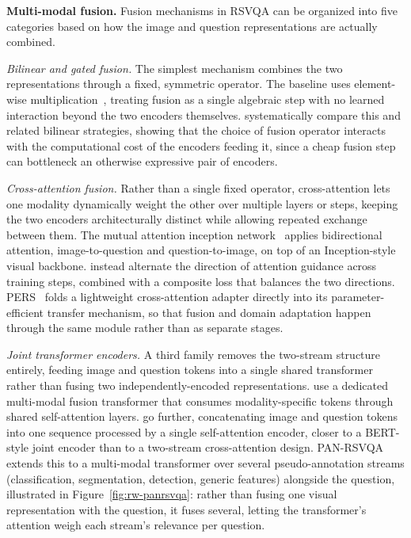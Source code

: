 \textbf{Multi-modal fusion.} Fusion mechanisms in RSVQA can be organized into five categories based on how the image and question representations are actually combined.

\textit{Bilinear and gated fusion.} The simplest mechanism combines the two representations through a fixed, symmetric operator. The baseline uses element-wise multiplication~\cite{lobry2020rsvqa}, treating fusion as a single algebraic step with no learned interaction beyond the two encoders themselves. \textcite{chappuis2021howtofind} systematically compare this and related bilinear strategies, showing that the choice of fusion operator interacts with the computational cost of the encoders feeding it, since a cheap fusion step can bottleneck an otherwise expressive pair of encoders.

\textit{Cross-attention fusion.} Rather than a single fixed operator, cross-attention lets one modality dynamically weight the other over multiple layers or steps, keeping the two encoders architecturally distinct while allowing repeated exchange between them. The mutual attention inception network~\cite{zheng2021mutual} applies bidirectional attention, image-to-question and question-to-image, on top of an Inception-style visual backbone. \textcite{feng2023alternate} instead alternate the direction of attention guidance across training steps, combined with a composite loss that balances the two directions. PERS~\cite{he2024pers} folds a lightweight cross-attention adapter directly into its parameter-efficient transfer mechanism, so that fusion and domain adaptation happen through the same module rather than as separate stages.

\textit{Joint transformer encoders.} A third family removes the two-stream structure entirely, feeding image and question tokens into a single shared transformer rather than fusing two independently-encoded representations. \textcite{siebert2022multimodal} use a dedicated multi-modal fusion transformer that consumes modality-specific tokens through shared self-attention layers. \textcite{silva2022rsvqa} go further, concatenating image and question tokens into one sequence processed by a single self-attention encoder, closer to a BERT-style joint encoder than to a two-stream cross-attention design. PAN-RSVQA~\cite{chappuis2025pan} extends this to a multi-modal transformer over several pseudo-annotation streams (classification, segmentation, detection, generic features) alongside the question, illustrated in Figure~\ref{fig:rw-panrsvqa}: rather than fusing one visual representation with the question, it fuses several, letting the transformer's attention weigh each stream's relevance per question.


